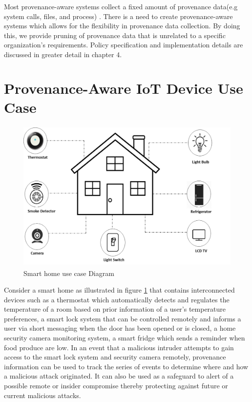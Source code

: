 Most provenance-aware systems collect a fixed amount of provenance data(e.g system calls, files, and process)  \cite{King:2003:BI:945445.945467, altintas,glavic_case_2011}. There is a need to create provenance-aware systems which allows for the flexibility in provenance data collection. By doing this, we provide pruning of provenance data that is unrelated to a specific organization's requirements. Policy specification and implementation details are discussed in greater detail in chapter 4.  







\section{Provenance-Aware IoT Device Use Case}

\begin{figure}[h]
\begin{center}
\includegraphics[height=3in]{smart_h.png}
\end{center}
\caption{Smart home use case Diagram}
\label{smart_home}
\end{figure}


Consider a smart home as illustrated in figure \ref{smart_home} that contains interconnected devices such as a thermostat which automatically detects and regulates the temperature of a room based on prior information of a user's temperature preferences, a smart lock system that can be controlled remotely and informs a user via short messaging when the door has been opened or is closed, a home security camera monitoring system, a smart fridge which sends a reminder when food produce are low. In an event that a malicious intruder attempts  to gain access to the smart lock system and security camera remotely, provenance information can be used to track the series  of events to determine where and how a malicious attack originated. It can also be used as a safeguard to alert of a possible remote or insider compromise thereby protecting against future or current malicious attacks. 






